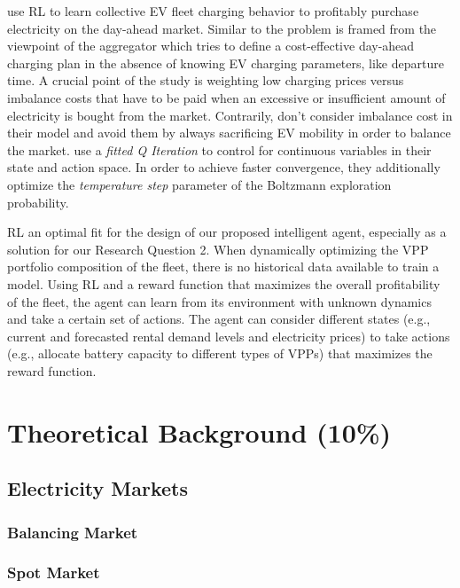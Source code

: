 \documentclass[12pt, article]{article}
\begin{document}
\textcite{vandael15_reinf_learn_heuris_ev_fleet} use RL to learn collective EV
fleet charging behavior to profitably purchase electricity on the day-ahead
market. Similar to \textcite{kahlen18_elect_vehic_virtual_power_plant_dilem} the
problem is framed from the viewpoint of the aggregator which tries to define a
cost-effective day-ahead charging plan in the absence of knowing EV charging
parameters, like departure time. A crucial point of the study is weighting low
charging prices versus imbalance costs that have to be paid when an excessive or
insufficient  amount of electricity is bought from the market. Contrarily,
\textcite{kahlen18_elect_vehic_virtual_power_plant_dilem} don't consider imbalance
cost in their model and avoid them by always sacrificing EV mobility in order to
balance the market. \textcite{vandael15_reinf_learn_heuris_ev_fleet} use a
\emph{fitted Q Iteration} to control for continuous variables in their state and
action space. In order to achieve faster convergence, they additionally optimize
the \emph{temperature step} parameter of the Boltzmann exploration probability.


RL an optimal fit for the design of our proposed intelligent agent, especially
as a solution for our Research Question 2. When dynamically optimizing the VPP
portfolio composition of the fleet, there is no historical data available to
train a model. Using RL and a reward function that maximizes the overall
profitability of the fleet, the agent can learn from its environment with
unknown dynamics and take a certain set of actions. The agent can consider
different states (e.g., current and forecasted rental demand levels and
electricity prices) to take actions (e.g., allocate battery capacity to
different types of VPPs) that maximizes the reward function.

\section{Theoretical Background (10\%)}
\label{sec:orgb2167de}
\subsection{Electricity Markets}
\label{sec:orgde36b0a}
\subsubsection{Balancing Market}
\label{sec:orge3158c7}
\subsubsection{Spot Market}
\label{sec:org58c19f8}
\end{document}
